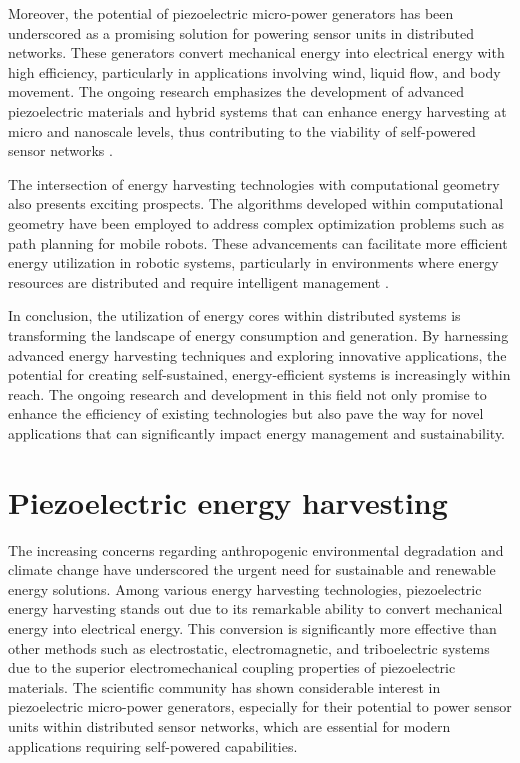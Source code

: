 \documentclass[runningheads]{llncs}
\begin{document}
Moreover, the potential of piezoelectric micro-power generators has been underscored as a promising solution for powering sensor units in distributed networks. These generators convert mechanical energy into electrical energy with high efficiency, particularly in applications involving wind, liquid flow, and body movement. The ongoing research emphasizes the development of advanced piezoelectric materials and hybrid systems that can enhance energy harvesting at micro and nanoscale levels, thus contributing to the viability of self-powered sensor networks \cite{Zehuan_2023}.

The intersection of energy harvesting technologies with computational geometry also presents exciting prospects. The algorithms developed within computational geometry have been employed to address complex optimization problems such as path planning for mobile robots. These advancements can facilitate more efficient energy utilization in robotic systems, particularly in environments where energy resources are distributed and require intelligent management \cite{Ehsan_2023}.

In conclusion, the utilization of energy cores within distributed systems is transforming the landscape of energy consumption and generation. By harnessing advanced energy harvesting techniques and exploring innovative applications, the potential for creating self-sustained, energy-efficient systems is increasingly within reach. The ongoing research and development in this field not only promise to enhance the efficiency of existing technologies but also pave the way for novel applications that can significantly impact energy management and sustainability.
\section{Piezoelectric energy harvesting}
The increasing concerns regarding anthropogenic environmental degradation and climate change have underscored the urgent need for sustainable and renewable energy solutions. Among various energy harvesting technologies, piezoelectric energy harvesting stands out due to its remarkable ability to convert mechanical energy into electrical energy. This conversion is significantly more effective than other methods such as electrostatic, electromagnetic, and triboelectric systems due to the superior electromechanical coupling properties of piezoelectric materials. The scientific community has shown considerable interest in piezoelectric micro-power generators, especially for their potential to power sensor units within distributed sensor networks, which are essential for modern applications requiring self-powered capabilities.
\end{document}
